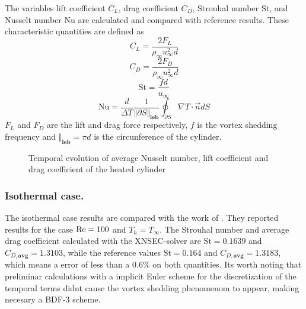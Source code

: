 The variables lift coefficient $C_L$, drag coefficient $C_D$, Strouhal number St, and Nusselt number Nu are calculated and compared with reference results. These characteristic quantities are defined as
\begin{equation} 
	C_L = \frac{2F_L}{\rho_\infty u^2_\infty d}
\end{equation}
\begin{equation}
	C_D = \frac{2F_D}{\rho_\infty u^2_\infty d}
\end{equation}
\begin{equation}
	\text{St} = \frac{fd}{u_\infty}
\end{equation}
\begin{equation}
	\text{Nu} = \frac{d}{\Delta T}\frac{1}{\Vert \partial S\Vert_{\textbf{leb}}}\oint_{\partial S} \nabla T \cdot \vec{n} dS
\end{equation}
$F_L$ and $F_D$ are the lift and drag force respectively, $f$ is the vortex shedding frequency and $\Vert_{\textbf{leb}} = \pi d$ is the circunference of the cylinder.
\begin{figure}[t]
	\centering	
	\caption{Temporal evolution of average Nusselt number, lift coefficient and drag coefficient of the heated cylinder}	\label{fig:HeatedCylinderResults}
\end{figure}
\subsubsection{Isothermal case.}
The isothermal case results are compared with the work of \cite{sharmaHEATFLUIDFLOW2004}. They reported results for the case $\text{Re} = 100$ and $T_h = T_\infty$. The Strouhal number and average drag coefficient calculated with the XNSEC-solver are $\text{St} = 0.1639$ and $C_{D,\textbf{avg}} = 1.3103$, while the reference values $\text{St} = 0.164$ and $C_{D,\textbf{avg}} = 1.3183$, which means a error of less than a 0.6\% on both quantities. Its worth noting that preliminar calculations with a implicit Euler scheme for the discretization of the temporal terms didnt cause the vortex shedding phenomenom to appear, making necesary a BDF-3 scheme.
